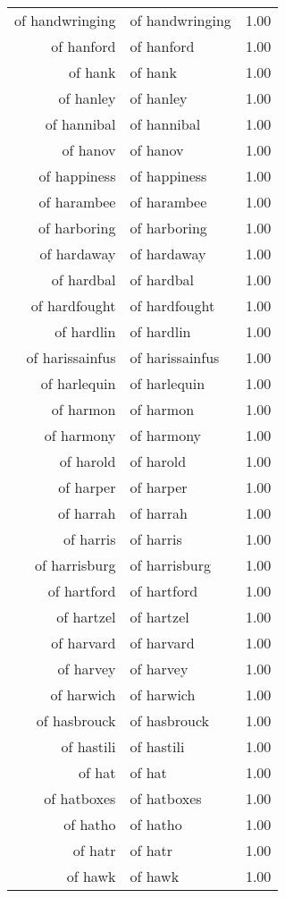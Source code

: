 \begin{table}[ht]
\begin{tabular}{rlr}
  of handwringing & of handwringing & 1.00 \\ 
  of hanford & of hanford & 1.00 \\ 
  of hank & of hank & 1.00 \\ 
  of hanley & of hanley & 1.00 \\ 
  of hannibal & of hannibal & 1.00 \\ 
  of hanov & of hanov & 1.00 \\ 
  of happiness & of happiness & 1.00 \\ 
  of harambee & of harambee & 1.00 \\ 
  of harboring & of harboring & 1.00 \\ 
  of hardaway & of hardaway & 1.00 \\ 
  of hardbal & of hardbal & 1.00 \\ 
  of hardfought & of hardfought & 1.00 \\ 
  of hardlin & of hardlin & 1.00 \\ 
  of harissainfus & of harissainfus & 1.00 \\ 
  of harlequin & of harlequin & 1.00 \\ 
  of harmon & of harmon & 1.00 \\ 
  of harmony & of harmony & 1.00 \\ 
  of harold & of harold & 1.00 \\ 
  of harper & of harper & 1.00 \\ 
  of harrah & of harrah & 1.00 \\ 
  of harris & of harris & 1.00 \\ 
  of harrisburg & of harrisburg & 1.00 \\ 
  of hartford & of hartford & 1.00 \\ 
  of hartzel & of hartzel & 1.00 \\ 
  of harvard & of harvard & 1.00 \\ 
  of harvey & of harvey & 1.00 \\ 
  of harwich & of harwich & 1.00 \\ 
  of hasbrouck & of hasbrouck & 1.00 \\ 
  of hastili & of hastili & 1.00 \\ 
  of hat & of hat & 1.00 \\ 
  of hatboxes & of hatboxes & 1.00 \\ 
  of hatho & of hatho & 1.00 \\ 
  of hatr & of hatr & 1.00 \\ 
  of hawk & of hawk & 1.00 \\ 

\end{tabular}
\end{table}
